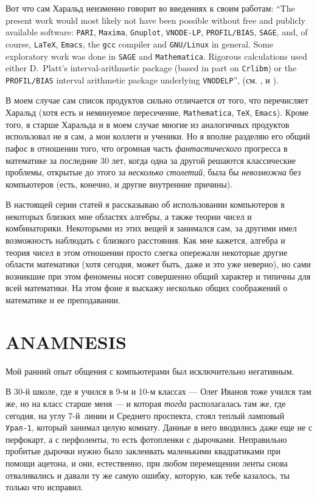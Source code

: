 \documentclass[intlimits,twoside,a4paper,11pt]{article}
\begin{document}
	Вот что сам Харальд неизменно говорит во введениях к своим работам:
	``The present work would most likely not have been possible without free and publicly available software: 
	{\tt PARI}, {\tt Maxima}, {\tt Gnuplot}, {\tt VNODE-LP}, {\tt PROFIL/BIAS}, 
	{\tt SAGE}, and, of course, {\tt \LaTeX}, {\tt Emacs}, the {\tt gcc} compiler and {\tt GNU/Linux} 
	in general. Some exploratory work was done in {\tt SAGE} and {\tt Mathematica}. Rigorous calculations 
	used either D.~Platt’s interval-arithmetic package (based in part on {\tt Crlibm}) 
	or the {\tt PROFIL/BIAS} interval arithmetic package underlying {\tt VNODELP}'', (см. \cite[p.~7]{H2}, 
	\cite[p.~8]{H3} и \cite[p.~ix]{H4}).
	\par
	В моем случае сам список продуктов сильно отличается от того, что перечисляет
	Харальд (хотя есть и неминуемое пересечение, {\tt Mathematica}, {\tt\TeX}, {\tt Emacs}).
	Кроме того, я старше Харальда и в моем случае многие из аналогичных продуктов 
	использовал не я сам, а мои коллеги и ученики. Но я вполне разделяю его общий 
	пафос в отношении того, что огромная часть {\it фантастического\/} прогресса в 
	математике за последние 30 лет, когда одна за другой решаются классические
	проблемы, открытые до этого за {\it несколько столетий\/}, была бы {\it невозможна\/} без 
	компьютеров (есть, конечно, и другие внутренние причины).
	\par
	В настоящей серии статей я рассказываю об использовании компьютеров в некоторых
	близких мне областях алгебры, а также теории чисел и комбинаторики. Некоторыми 
	из этих вещей я занимался сам, за другими имел возможность наблюдать с близкого
	расстояния.  Как мне кажется, алгебра и теория чисел в этом отношении просто
	слегка опережали некоторые другие области математики (хотя сегодня, может быть, 
	даже и это уже неверно), но сами возникшие при этом феномены носят совершенно 
	общий характер и типичны для всей математики. На этом фоне я выскажу 
	несколько общих соображений о математике и ее преподавании. 
	
	
	
	\section{ANAMNESIS}
	
	Мой ранний опыт общения с компьютерами был исключительно негативным.
	
	В 30-й школе, где я учился в 9-м и 10-м классах --- Олег Иванов тоже учился там же,  
	но на класс старше меня --- и которая {\it тогда\/} располагалась 
	там же, где сегодня, на углу 7-й~линии и Среднего проспекта, стоял теплый ламповый 
	{\tt Урал-1}, который занимал целую комнату. Данные в него вводились даже еще не с 
	перфокарт, а с перфоленты, то есть фотопленки с дырочками. Неправильно пробитые 
	дырочки нужно было заклеивать маленькими квадратиками при помощи ацетона,
	и они, естественно, при любом перемещении ленты снова отваливались и давали 
	ту же самую ошибку, которую, как тебе казалось, ты только что исправил.   
	
\end{document}
